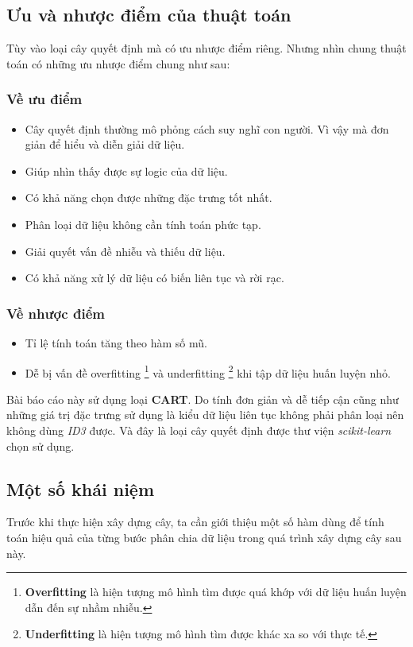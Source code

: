\documentclass[../main-report.tex]{subfiles}
\begin{document}
\subsection{Ưu và nhược điểm của thuật toán}
Tùy vào loại cây quyết định mà có ưu nhược điểm riêng. Nhưng nhìn chung thuật toán có những ưu nhược điểm chung như sau:
\subsubsection*{Về ưu điểm}
\begin{itemize}
\item Cây quyết định thường mô phỏng cách suy nghĩ con người. Vì vậy mà đơn giản để hiểu và diễn giải dữ liệu.
\item Giúp nhìn thấy được sự logic của dữ liệu.
\item Có khả năng chọn được những đặc trưng tốt nhất.
\item Phân loại dữ liệu không cần tính toán phức tạp.
\item Giải quyết vấn đề nhiễu và thiếu dữ liệu.
\item Có khả năng xử lý dữ liệu có biến liên tục và rời rạc.
\end{itemize}

\subsubsection*{Về nhược điểm}
\begin{itemize}
\item Tỉ lệ tính toán tăng theo hàm số mũ.
\item Dễ bị vấn đề overfitting \footnote{\textbf{Overfitting} là hiện tượng mô hình tìm được quá khớp với dữ liệu huấn luyện dẫn đến sự nhầm nhiễu.} và underfitting \footnote{\textbf{Underfitting} là hiện tượng mô hình tìm được khác xa so với thực tế.} khi tập dữ liệu huấn luyện nhỏ.
\end{itemize}

Bài báo cáo này sử dụng loại \textbf{CART}. Do tính đơn giản và dễ tiếp cận cũng như những giá trị đặc trưng sử dụng là kiểu dữ liệu liên tục không phải phân loại nên không dùng \emph{ID3} được. Và đây là loại cây quyết định được thư viện \textit{scikit-learn} chọn sử dụng.

\subsection{Một số khái niệm}
Trước khi thực hiện xây dựng cây, ta cần giới thiệu một số hàm dùng để tính toán hiệu quả của từng bước phân chia dữ liệu trong quá trình xây dựng cây sau này.
\end{document}
